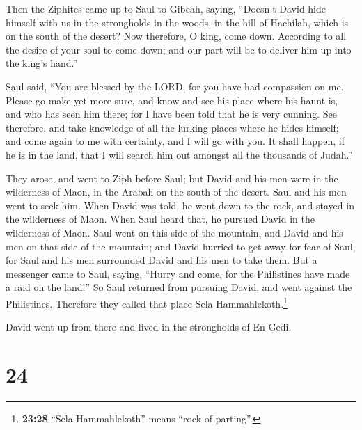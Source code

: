  Then the Ziphites came up to Saul to Gibeah, saying,
``Doesn't David hide himself with us in the strongholds in the woods, in
the hill of Hachilah, which is on the south of the desert?
 Now therefore, O king, come down. According to all the
desire of your soul to come down; and our part will be to deliver him up
into the king's hand.''

 Saul said, ``You are blessed by the LORD, for you have
had compassion on me.  Please go make yet more sure, and
know and see his place where his haunt is, and who has seen him there;
for I have been told that he is very cunning.  See
therefore, and take knowledge of all the lurking places where he hides
himself; and come again to me with certainty, and I will go with you. It
shall happen, if he is in the land, that I will search him out amongst
all the thousands of Judah.''

 They arose, and went to Ziph before Saul; but David and
his men were in the wilderness of Maon, in the Arabah on the south of
the desert.  Saul and his men went to seek him. When
David was told, he went down to the rock, and stayed in the wilderness
of Maon. When Saul heard that, he pursued David in the wilderness of
Maon.  Saul went on this side of the mountain, and David
and his men on that side of the mountain; and David hurried to get away
for fear of Saul, for Saul and his men surrounded David and his men to
take them.  But a messenger came to Saul, saying, ``Hurry
and come, for the Philistines have made a raid on the land!''
 So Saul returned from pursuing David, and went against
the Philistines. Therefore they called that place Sela
Hammahlekoth.\footnote{\textbf{23:28} ``Sela Hammahlekoth'' means ``rock
  of parting''.}

 David went up from there and lived in the strongholds of
En Gedi.

\hypertarget{section-23}{%
\section{24}\label{section-23}}

